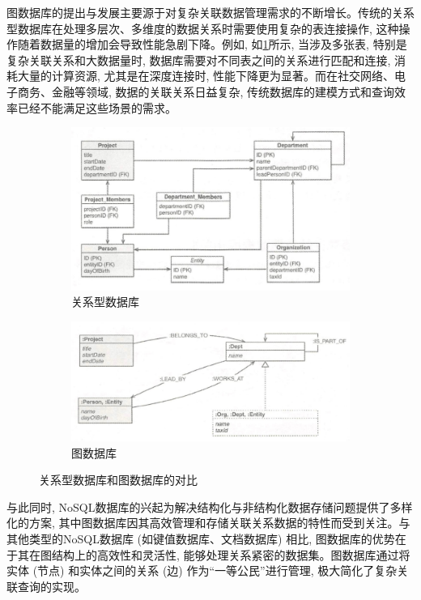 图数据库的提出与发展主要源于对复杂关联数据管理需求的不断增长。传统的关系型数据库在处理多层次、多维度的数据关系时需要使用复杂的表连接操作, 这种操作随着数据量的增加会导致性能急剧下降。例如, 如\cref{fig:relational}所示, 当涉及多张表, 特别是复杂关联关系和大数据量时, 数据库需要对不同表之间的关系进行匹配和连接, 消耗大量的计算资源, 尤其是在深度连接时, 性能下降更为显著。而在社交网络、电子商务、金融等领域, 数据的关联关系日益复杂, 传统数据库的建模方式和查询效率已经不能满足这些场景的需求。
\begin{figure}[!t]
	\centering
	\begin{subfigure}[b]{1\textwidth} \includegraphics[width=\textwidth]{images/14.png}
    \caption{关系型数据库}
    \label{fig:relational}
	\end{subfigure}

	\begin{subfigure}[b]{1\textwidth} \includegraphics[width=\textwidth]{images/15.png}
    \caption{图数据库}
    \label{fig:graph_db}
	\end{subfigure}
	\caption{关系型数据库和图数据库的对比}
	\label{fig:relational_vs_graph}
\end{figure}


与此同时, NoSQL数据库的兴起为解决结构化与非结构化数据存储问题提供了多样化的方案, 其中图数据库因其高效管理和存储关联关系数据的特性而受到关注。与其他类型的NoSQL数据库 (如键值数据库、文档数据库) 相比, 图数据库的优势在于其在图结构上的高效性和灵活性, 能够处理关系紧密的数据集。图数据库通过将实体 (节点) 和实体之间的关系 (边) 作为“一等公民”进行管理, 极大简化了复杂关联查询的实现。

